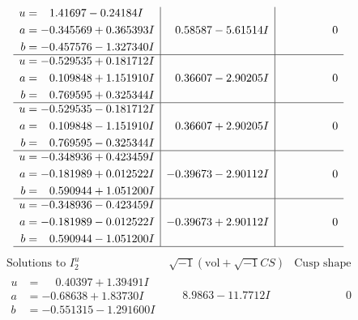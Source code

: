 \documentclass[1p]{elsarticle_modified}
\theoremstyle{definition}
\newcommand{\I}{\sqrt{-1}}
\begin{document}
$$\begin{array}{c|c|c}
\begin{aligned}
u &= \phantom{-}1.41697 - 0.24184 I \\
a &= -0.345569 + 0.365393 I \\
b &= -0.457576 - 1.327340 I\end{aligned}
 & \phantom{-}0.58587 - 5.61514 I & \phantom{-0.000000 } 0 \\ \hline\begin{aligned}
u &= -0.529535 + 0.181712 I \\
a &= \phantom{-}0.109848 + 1.151910 I \\
b &= \phantom{-}0.769595 + 0.325344 I\end{aligned}
 & \phantom{-}0.36607 - 2.90205 I & \phantom{-0.000000 } 0 \\ \hline\begin{aligned}
u &= -0.529535 - 0.181712 I \\
a &= \phantom{-}0.109848 - 1.151910 I \\
b &= \phantom{-}0.769595 - 0.325344 I\end{aligned}
 & \phantom{-}0.36607 + 2.90205 I & \phantom{-0.000000 } 0 \\ \hline\begin{aligned}
u &= -0.348936 + 0.423459 I \\
a &= -0.181989 + 0.012522 I \\
b &= \phantom{-}0.590944 + 1.051200 I\end{aligned}
 & -0.39673 - 2.90112 I & \phantom{-0.000000 } 0 \\ \hline\begin{aligned}
u &= -0.348936 - 0.423459 I \\
a &= -0.181989 - 0.012522 I \\
b &= \phantom{-}0.590944 - 1.051200 I\end{aligned}
 & -0.39673 + 2.90112 I & \phantom{-0.000000 } 0\\
 \hline 
 \end{array}$$\newpage$$\begin{array}{c|c|c}  
\text{Solutions to }I^u_{2}& \I (\text{vol} + \sqrt{-1}CS) & \text{Cusp shape}\\
 \hline 
\begin{aligned}
u &= \phantom{-}0.40397 + 1.39491 I \\
a &= -0.68638 + 1.83730 I \\
b &= -0.551315 - 1.291600 I\end{aligned}
 & \phantom{-}8.9863 - 11.7712 I & \phantom{-0.000000 } 0 \\ \hline\begin{aligned}

\end{aligned}
\end{array}$$
\end{document}
